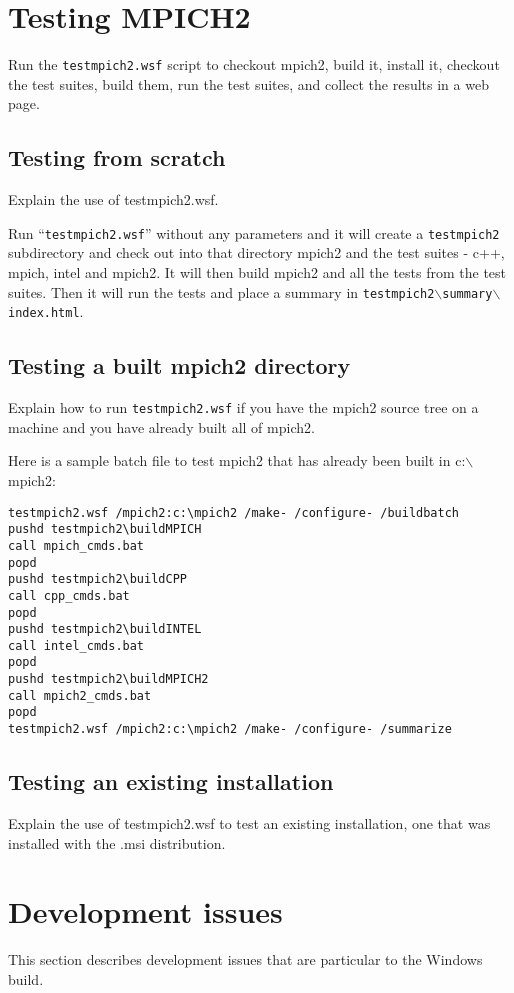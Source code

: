 \documentclass[dvipdfm,11pt]{article}
\begin{document}
\section{Testing MPICH2}
\label{sec:testing}

Run the \texttt{testmpich2.wsf} script to checkout mpich2, build it, install it, checkout 
the test suites, build them, run the test suites, and collect the results in a web page.

\subsection{Testing from scratch}
Explain the use of testmpich2.wsf.

Run ``\texttt{testmpich2.wsf}'' without any parameters and it will create a \texttt{testmpich2}
subdirectory and check out into that directory mpich2 and the test suites - c++, mpich, intel
and mpich2.  It will then build mpich2 and all the tests from the test suites.  Then it will run
the tests and place a summary in \texttt{testmpich2$\backslash$summary$\backslash$index.html}.

\subsection{Testing a built mpich2 directory}
Explain how to run \texttt{testmpich2.wsf} if you have the mpich2 source tree on a machine and you 
have already built all of mpich2.

Here is a sample batch file to test mpich2 that has already been built in c:$\backslash$mpich2:
\begin{verbatim}
testmpich2.wsf /mpich2:c:\mpich2 /make- /configure- /buildbatch
pushd testmpich2\buildMPICH
call mpich_cmds.bat
popd
pushd testmpich2\buildCPP
call cpp_cmds.bat
popd
pushd testmpich2\buildINTEL
call intel_cmds.bat
popd
pushd testmpich2\buildMPICH2
call mpich2_cmds.bat
popd
testmpich2.wsf /mpich2:c:\mpich2 /make- /configure- /summarize
\end{verbatim}

\subsection{Testing an existing installation}
Explain the use of testmpich2.wsf to test an existing installation, one that was installed
with the .msi distribution.

\section{Development issues}
This section describes development issues that are particular to the Windows build.
\end{document}
